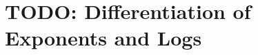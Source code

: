 \chapter{TODO: Differentiation of Exponents and Logs}
\label{chap:DifferentiationOfExponentsAndLogs}